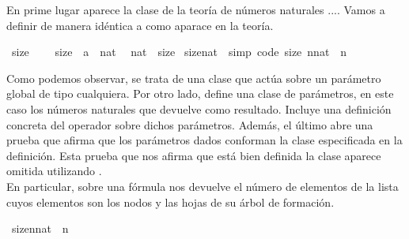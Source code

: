 \begin{isabellebody}
{\isafoldproof}%
%
\isadelimproof
%
\endisadelimproof
%
\begin{isamarkuptext}%
En prime lugar aparece la clase  de la teoría de números naturales ....
Vamos a definir  de manera idéntica a como aparace  en la teoría.%
\end{isamarkuptext}\isamarkuptrue%
\isamarkupfalse%
\ size{}\ {\isacharequal}\isanewline
\ \ \ size{}\ {\isacharcolon}{\isacharcolon}\ {\isachardoublequoteopen}{\isacharprime}a\ {\isasymRightarrow}\ nat{\isachardoublequoteclose}\ \isanewline
\isanewline
{}\isamarkupfalse%
\ nat\ {\isacharcolon}{\isacharcolon}\ size{}\isanewline
{}\isanewline
\isanewline
{}\isamarkupfalse%
\ size{}{\isacharunderscore}nat\ \ {\isacharbrackleft}simp{\isacharcomma}\ code{\isacharbrackright}{\isacharcolon}\ {\isachardoublequoteopen}size{}\ {\isacharparenleft}n{\isacharcolon}{\isacharcolon}nat{\isacharparenright}\ {\isacharequal}\ n{\isachardoublequoteclose}\isanewline
\isanewline
{}\isamarkupfalse%
%
\isadelimproof
\ %
\endisadelimproof
%
\isatagproof
\isacommand{{\isachardot}{\isachardot}}\isamarkupfalse%
%
\endisatagproof
{\isafoldproof}%
%
\isadelimproof
%
\endisadelimproof
\isanewline
\isanewline
{}\isamarkupfalse%
%
\begin{isamarkuptext}%
Como podemos observar, se trata de una clase que actúa sobre un parámetro global
de tipo  cualquiera. Por otro lado,  define una clase de
parámetros, en este caso los números naturales  que devuelve como resultado. Incluye
una definición concreta del operador  sobre dichos parámetros. Además, el 
último  abre una prueba que afirma que los parámetros dados conforman la clase 
especificada en la definición. Esta prueba que nos afirma que está bien definida la clase aparece
omitida utilizando \isa{{\isachardot}{\isachardot}} .
\\
En particular,
sobre una fórmula nos devuelve el número de elementos de la lista cuyos elementos son los nodos
y las hojas de su árbol de formación.%
\end{isamarkuptext}\isamarkuptrue%
\isamarkupfalse%
\ {\isachardoublequoteopen}size{\isacharparenleft}n{\isacharcolon}{\isacharcolon}nat{\isacharparenright}\ {\isacharequal}\ n{\isachardoublequoteclose}\isanewline

\end{isabellebody}
